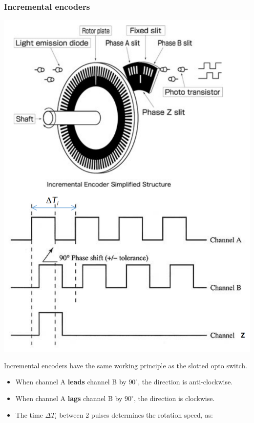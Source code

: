 \documentclass[11pt]{article}
\begin{document}
\subsubsection{Incremental encoders}
\label{sec:org56d1338}
\begin{center}
\includegraphics[scale=0.7]{./images/incremental-encoder.png}
\end{center}
Incremental encoders have the same working principle as the slotted opto switch.
\begin{itemize}
\item When channel A \textbf{leads} channel B by \(90^{\circ}\), the direction is anti-clockwise.
\item When channel A \textbf{lags} channel B by \(90^{\circ}\), the direction is clockwise.
\item The time \(\Delta T_i\) between 2 pulses determines the rotation speed, as:
\end{itemize}
\end{document}
